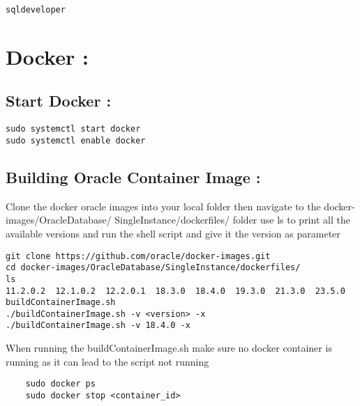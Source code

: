 \documentclass{article}
\begin{document}
\vspace{0.5cm}
\begin{tcolorbox}[title = Running Sqldeveloper]
    \begin{verbatim}
sqldeveloper
    \end{verbatim}
\end{tcolorbox}

\vspace{0.25cm}
\section{Docker : }
\subsection{Start Docker :}

\vspace{0.25cm}
\begin{tcolorbox}[title = starting docker]
\begin{verbatim}
sudo systemctl start docker
sudo systemctl enable docker
\end{verbatim}
\end{tcolorbox}

\vspace{0.25cm}
\subsection{Building Oracle Container Image :}

\vspace{0.25cm}
\begin{tcolorbox}[title = Pulling oracle-xe]
Clone the docker oracle images into your local folder then navigate to the docker-images/OracleDatabase/
SingleInstance/dockerfiles/
folder use ls to print all the available versions and run the shell script and give it the version as parameter
\begin{verbatim}
git clone https://github.com/oracle/docker-images.git
cd docker-images/OracleDatabase/SingleInstance/dockerfiles/
ls
11.2.0.2  12.1.0.2  12.2.0.1  18.3.0  18.4.0  19.3.0  21.3.0  23.5.0  buildContainerImage.sh
./buildContainerImage.sh -v <version> -x
./buildContainerImage.sh -v 18.4.0 -x 
\end{verbatim}

\end{tcolorbox}

\vspace{0.5cm}
\begin{tcolorbox}[title = Note]
When running the buildContainerImage.sh make sure no docker container is running as it can lead to the script
not running 
\begin{verbatim}
    sudo docker ps 
    sudo docker stop <container_id>
\end{verbatim}
\end{tcolorbox}
\end{document}
